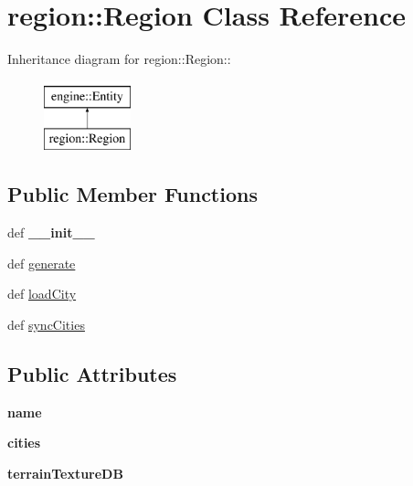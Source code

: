 \hypertarget{classregion_1_1Region}{
\section{region::Region Class Reference}
\label{classregion_1_1Region}
}
Inheritance diagram for region::Region::\begin{figure}[H]
\begin{center}
\leavevmode
\includegraphics[height=2cm]{classregion_1_1Region}
\end{center}
\end{figure}
\subsection*{Public Member Functions}
\begin{DoxyCompactItemize}
\item 
\hypertarget{classregion_1_1Region_a9b4be4786787466e271d97fb8063c8f2}{
def {\bfseries \_\-\_\-init\_\-\_\-}}
\label{classregion_1_1Region_a9b4be4786787466e271d97fb8063c8f2}

\item 
def \hyperlink{classregion_1_1Region_a526194edb7c6a6cb23d3f36a89093cf8}{generate}
\item 
def \hyperlink{classregion_1_1Region_a496244739549595cb98062d08d774ec1}{loadCity}
\item 
def \hyperlink{classregion_1_1Region_a7b8b846713ca3d88d57d9939aafe7ab4}{syncCities}
\end{DoxyCompactItemize}
\subsection*{Public Attributes}
\begin{DoxyCompactItemize}
\item 
\hypertarget{classregion_1_1Region_aee27735b667d7300346a5b301a24ef61}{
{\bfseries name}}
\label{classregion_1_1Region_aee27735b667d7300346a5b301a24ef61}

\item 
\hypertarget{classregion_1_1Region_a8be52b89fefd13a44cf9ae1f0be2ee15}{
{\bfseries cities}}
\label{classregion_1_1Region_a8be52b89fefd13a44cf9ae1f0be2ee15}

\item 
\hypertarget{classregion_1_1Region_a4fd333b6f3d9baf0c32cadcd97051225}{
{\bfseries terrainTextureDB}}
\label{classregion_1_1Region_a4fd333b6f3d9baf0c32cadcd97051225}

\end{DoxyCompactItemize}


